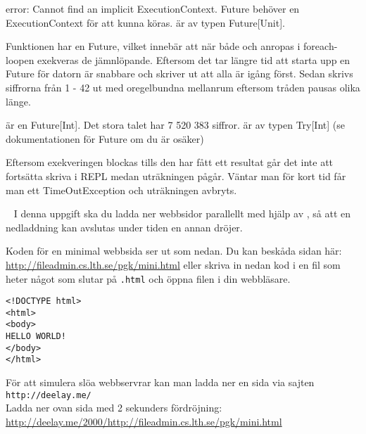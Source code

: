 \SOLUTION


\TaskSolved \what

\SubtaskSolved  error: Cannot find an implicit ExecutionContext. Future behöver en ExecutionContext för att kunna köras.  är av typen Future[Unit].

\SubtaskSolved  Funktionen  har en Future, vilket innebär att när både  och  anropas i foreach-loopen exekveras de jämnlöpande. Eftersom det tar längre tid att starta upp en Future för datorn är  snabbare och skriver ut att alla är igång först. Sedan skrivs siffrorna från 1 - 42 ut med oregelbundna mellanrum eftersom tråden pausas olika länge.

\SubtaskSolved  {} är en Future[Int]. Det stora talet har 7 520 383 siffror.  är av typen Try[Int] (se dokumentationen för Future om du är osäker)

\SubtaskSolved  Eftersom exekveringen blockas tills den har fått ett resultat går det inte att fortsätta skriva i REPL medan uträkningen pågår. Väntar man för kort tid får man ett TimeOutException och uträkningen avbryts.


\QUESTEND







\QUESTBEGIN

\Task  \what~
I denna uppgift ska du ladda ner webbsidor parallellt med hjälp av , så att en nedladdning kan avslutas under tiden en annan dröjer.

\Subtask Koden för en minimal webbsida ser ut som nedan. Du kan beskåda sidan här: \url{http://fileadmin.cs.lth.se/pgk/mini.html} eller skriva in nedan kod i en fil som heter något som slutar på \texttt{.html} och öppna filen i din webbläsare.

\begin{verbatim}
<!DOCTYPE html>
<html>
<body>
HELLO WORLD!
</body>
</html>
\end{verbatim}

\Subtask För att simulera slöa webbservrar kan man ladda ner en sida via sajten \\\texttt{http://deelay.me/} \\ Ladda ner ovan sida med 2 sekunders fördröjning:\\
\url{http://deelay.me/2000/http://fileadmin.cs.lth.se/pgk/mini.html}

